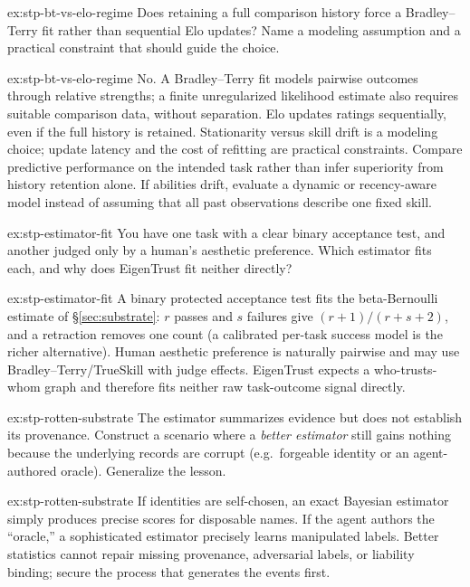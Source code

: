 \documentclass[11pt,a4paper]{article}
\theoremstyle{definition}
\begin{document}

\begin{pdexercise}[kind=Check,rating=1]{ex:stp-bt-vs-elo-regime}
Does retaining a full comparison history force a Bradley--Terry fit rather
than sequential Elo updates? Name a modeling assumption and a practical
constraint that should guide the choice.
\end{pdexercise}
\begin{pdsolution}{ex:stp-bt-vs-elo-regime}
No. A Bradley--Terry fit models pairwise outcomes through relative strengths;
a finite unregularized likelihood estimate also requires suitable comparison
data, without separation. Elo updates ratings sequentially, even if the full
history is retained. Stationarity versus skill drift is a modeling choice;
update latency and the cost of refitting are practical constraints. Compare
predictive performance on the intended task rather than infer superiority from
history retention alone. If abilities drift, evaluate a dynamic or recency-aware
model instead of assuming that all past observations describe one fixed skill.
\end{pdsolution}
\begin{pdexercise}[kind=Trace,rating=2]{ex:stp-estimator-fit}
You have one task with a clear binary acceptance test, and another judged
only by a human's aesthetic preference. Which estimator fits each, and why
does EigenTrust fit neither directly?
\end{pdexercise}
\begin{pdsolution}{ex:stp-estimator-fit}
A binary protected acceptance test fits the beta-Bernoulli estimate of
\S\ref{sec:substrate}: $r$ passes and $s$ failures give $(r+1)/(r+s+2)$, and a
retraction removes one count (a calibrated per-task success model is the
richer alternative). Human aesthetic preference
is naturally pairwise and may use Bradley--Terry/TrueSkill with judge
effects. EigenTrust expects a who-trusts-whom graph and therefore fits
neither raw task-outcome signal directly.
\end{pdsolution}
\begin{pdexercise}[kind=Open,rating=3]{ex:stp-rotten-substrate}
The estimator summarizes evidence but does not establish its provenance.
Construct a scenario where a \emph{better estimator} still gains nothing
because the underlying records are corrupt (e.g.\ forgeable identity or an
agent-authored oracle). Generalize the lesson.
\end{pdexercise}
\begin{pdsolution}{ex:stp-rotten-substrate}
If identities are self-chosen, an exact Bayesian estimator simply produces
precise scores for disposable names. If the agent authors the ``oracle,'' a
sophisticated estimator precisely learns manipulated labels. Better
statistics cannot repair missing provenance, adversarial labels, or
liability binding; secure the process that generates the events first.
\end{pdsolution}
\end{document}

